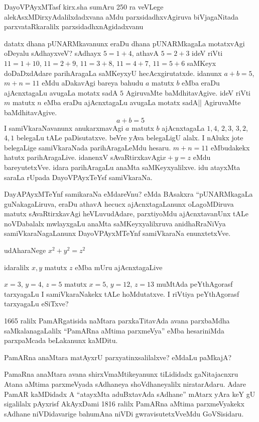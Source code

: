 DayoVPAyxMTasf kirx.sha sumAru {\rm 250} ra veVLege alekAsxMDirxyAdalilxdadxvana aMdu parxsidadhxvAgiruva biVjagaNitada parxvataRkaralilx parxsidadhxnAgidadxvanu

datatx dhana pUNARMkavanunx eraDu dhana pUNARMkagaLa motatxvAgi oDeyalu sAdhayxveV? sAdhayx \quad $5=1+4$, \quad athavA \quad $5=2+3$ \quad ideV riVti \quad $11=1+10$, \quad $11=2+9$, \quad $11=3+8$, \quad $11=4+7$, \quad $11=5+6$ \quad saMKeyx doDaDxdAdare parihAragaLa saMKeyxyU hecAcxgirutatxde. idanunx \quad $a+b=5$, \quad $m+n=11$ \quad eMdu aDakavAgi bareya bahudu \quad $a$ \quad matutx \quad $b$ \quad eMba eraDu ajAcnxtagaLu avugaLa motatx sadA $5$ AgiruvaMte baMdhitavAgive. ideV riVti \quad $m$ \quad matutx \quad $n$ \quad eMba eraDu ajAcnxtagaLu avugaLa motatx sadA|| AgiruvaMte baMdhitavAgive.
$$
a+b=5
$$
I samiVkaraNavanunx anukarxmavAgi $a$ matutx $b$ ajAcnxtagaLa \quad $1, 4$, \quad $2, 3$, \quad $3, 2$, $4, 1$ \quad belegaLu tALe paDisutatxve. beVre yAva belegaLigU alalx. I nAlukx jote belegaLige samiVkaraNada parihAragaLeMdu hesaru. \quad $m+n=11$ \quad eMbudakekx hatutx parihAragaLive. idanenxV sAvaRtirxkavAgi\quad  $x+y=z$ \quad eMdu bareyutetxVve. idara parihAragaLu anaMta saMKeyxyalilxve. idu atayxMta saraLa rUpada DayoVPAyxTeYsf samiVkaraNa.

DayAPAyxMTeYnf samikaraNa eMdareVnu? eMda BAsakxra ``pUNARMkagaLa guNakagaLiruva, eraDu athavA hecucx ajAcnxtagaLanunx oLagoMDiruva matutx sAvaRtirxkavAgi heVLuvudAdare, parxtiyoMdu ajAcnxtavanUnx tALe noVDabalalx mwlayxgaLu anaMta saMKeyxyalilxruva anidhaRraNiVya samiVkaraNagaLanunx DayoVPAyxMTeYnf samiVkaraNa enunxtetxVve.

udAharaNege \quad $x^2+y^2=z^2$

idaralilx $x, y$ matutx $z$ eMba mUru ajAcnxtagaLive 

$x=3$, \quad $y=4$, \quad $z=5$ \quad matutx \quad $x=5$, \quad $y=12$, \quad $z=13$ \quad muMtAda peYthAgorasf tarxyagaLu I samiVkaraNakekx tALe hoMdutatxve. I riVtiya peYthAgorasf tarxyagaLu eSiTxve? 

{\rm 1665} ralilx PamARgatisida naMtara parxkaTitavAda avana parxbaMdha saMkalanagaLalilx ``PamARna aMtima parxmeVya'' eMba hesariniMda parxpaMcada beLakanunx kaMDitu.

PamARna anaMtara matAyxrU parxyatinxsalilalxve? eMdaLu paMkajA?

PamaRna anaMtara avana shirxVmaMtikeyanunx tiLididadx gaNitajacnxru Atana aMtima parxmeVyada sAdhaneya shoVdhaneyalilx niratarAdaru. Adare PamAR kaMDidadx A ``atayxMta aduBxtavAda sAdhane'' mAtarx yAra keY gU sigalilalx pAyxrisf AkAyxDami {\rm 1816} ralilx PamARna aMtima parxmeVyakekx sAdhane niVDidavarige bahumAna niVDi gwravisutetxVveMdu  GoVSisidaru.

